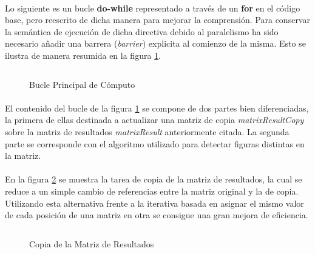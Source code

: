 \documentclass[10pt, a4paper,spanish]{article}
\begin{document}
		\paragraph{}
		Lo siguiente es un bucle \textbf{do-while} representado a través de un \textbf{for} en el código base, pero reescrito de dicha manera para mejorar la comprensión. Para conservar la semántica de ejecución de dicha directiva debido al paralelismo ha sido necesario añadir una barrera (\emph{barrier}) explicita al comienzo de la misma. Esto se ilustra de manera resumida en la figura \ref{code:op_do_while}.

		\begin{figure}[H]
			\centering
			\inputminted{c}{./code/op-do-while.c}
			\caption{Bucle Principal de Cómputo}
			\label{code:op_do_while}
		\end{figure}

		\paragraph{}
		El contenido del bucle de la figura \ref{code:op_do_while} se compone de dos partes bien diferenciadas, la primera de ellas destinada a actualizar una matriz de copia \emph{matrixResultCopy} sobre la matriz de resultados \emph{matrixResult} anteriormente citada. La segunda parte se corresponde con el algoritmo utilizado para detectar figuras distintas en la matriz.

		\paragraph{}
		En la figura \ref{code:op_2} se muestra la tarea de copia de la matriz de resultados, la cual se reduce a un simple cambio de referencias entre la matriz original y la de copia. Utilizando esta alternativa frente a la iterativa basada en asignar el mismo valor de cada posición de una matriz en otra se consigue una gran mejora de eficiencia.

		\begin{figure}[H]
			\centering
			\inputminted{c}{./code/op2.c}
			\caption{Copia de la Matriz de Resultados}
			\label{code:op_2}
		\end{figure}
\end{document}
